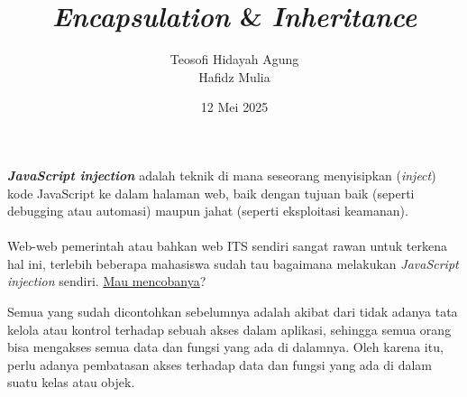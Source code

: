 \documentclass{../praktikum-ppt}
\author[Tew \& Haf]{Teosofi Hidayah Agung \\ Hafidz Mulia}
\date{12 Mei 2025}
\title[Alpro 2 - Week 7]{\textit{Encapsulation} \& \textit{Inheritance}}
\institute[Matematika ITS]{Departemen Matematika\\ Institut Teknologi Sepuluh Nopember}
\begin{document}
{
\begin{frame}
  \titlepage
\end{frame}
}


    { 
      \begin{frame}
      \textbf{\textit{JavaScript injection}} adalah teknik di mana seseorang menyisipkan (\textit{inject}) kode JavaScript ke dalam halaman web, baik dengan tujuan baik (seperti debugging atau automasi) maupun jahat (seperti eksploitasi keamanan).\\~\\

      Web-web pemerintah atau bahkan web ITS sendiri sangat rawan untuk terkena hal ini, terlebih beberapa mahasiswa sudah tau bagaimana melakukan \textit{JavaScript injection} sendiri. \underline{Mau mencobanya}?
    \end{frame}
    
    \begin{frame}
      \begin{masalah}
        Semua yang sudah dicontohkan sebelumnya adalah akibat dari tidak adanya tata kelola atau kontrol terhadap sebuah akses dalam aplikasi, sehingga semua orang bisa mengakses semua data dan fungsi yang ada di dalamnya. Oleh karena itu, perlu adanya pembatasan akses terhadap data dan fungsi yang ada di dalam suatu kelas atau objek.
      \end{masalah}
    \end{frame}
    }
\end{document}
